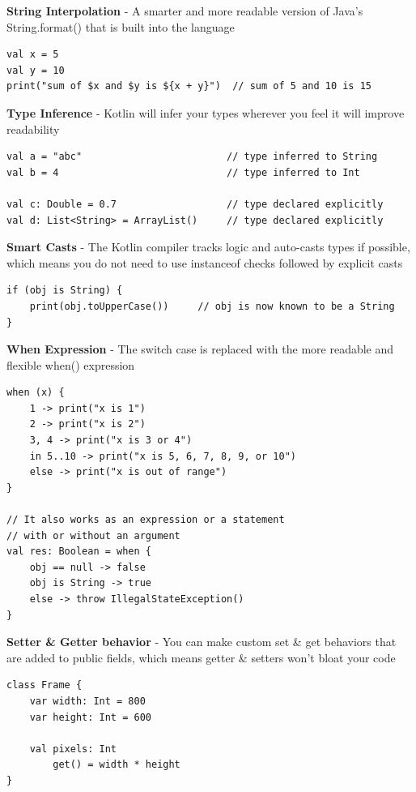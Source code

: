 \textbf{String Interpolation} - A smarter and more readable version of Java's String.format() that is built into the language
\begin{verbatim}
val x = 5
val y = 10
print("sum of $x and $y is ${x + y}")  // sum of 5 and 10 is 15

\end{verbatim}

\textbf{Type Inference} - Kotlin will infer your types wherever you feel it will improve readability
\begin{verbatim}
val a = "abc"                         // type inferred to String
val b = 4                             // type inferred to Int

val c: Double = 0.7                   // type declared explicitly
val d: List<String> = ArrayList()     // type declared explicitly
\end{verbatim}

\textbf{Smart Casts} - The Kotlin compiler tracks logic and auto-casts types if possible, which means you do not need to use instanceof checks followed by explicit casts
\begin{verbatim}
if (obj is String) {
    print(obj.toUpperCase())     // obj is now known to be a String
}
\end{verbatim}

\textbf{When Expression} - The switch case is replaced with the more readable and flexible when() expression
\begin{verbatim}
when (x) {
    1 -> print("x is 1")
    2 -> print("x is 2")
    3, 4 -> print("x is 3 or 4")
    in 5..10 -> print("x is 5, 6, 7, 8, 9, or 10")
    else -> print("x is out of range")
}

// It also works as an expression or a statement
// with or without an argument
val res: Boolean = when {
    obj == null -> false
    obj is String -> true
    else -> throw IllegalStateException()
}
\end{verbatim}

\textbf{Setter \& Getter behavior} - You can make custom set \& get behaviors that are added to public fields, which means getter \& setters won't bloat your code
\begin{verbatim}
class Frame {
    var width: Int = 800
    var height: Int = 600

    val pixels: Int
        get() = width * height
}
\end{verbatim}

